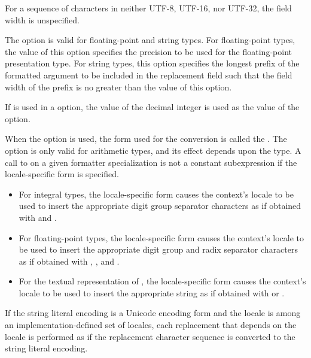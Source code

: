 \pnum
For a sequence of characters in neither UTF-8, UTF-16, nor UTF-32,
the field width is unspecified.

\pnum
The  option is valid
for floating-point and string types.
For floating-point types,
the value of this option specifies the precision
to be used for the floating-point presentation type.
For string types,
this option specifies the longest prefix of the formatted argument
to be included in the replacement field such that
the field width of the prefix is no greater than the value of this option.

\pnum
If  is used in
a  option,
the value of the decimal integer is used as the value of the option.

\pnum
When the  option is used, the form used for the conversion is called
the .
The  option is only valid for arithmetic types, and
its effect depends upon the type.
A call to  on a given formatter specialization
is not a constant subexpression if the locale-specific form is specified.
\begin{itemize}
\item
For integral types, the locale-specific form
causes the context's locale to be used
to insert the appropriate digit group separator characters
as if obtained with
 and
.

\item
For floating-point types, the locale-specific form
causes the context's locale to be used
to insert the appropriate digit group and radix separator characters
as if obtained with
,
, and
.

\item
For the textual representation of , the locale-specific form
causes the context's locale to be used
to insert the appropriate string as if obtained
with  or .
\end{itemize}
If the string literal encoding is a Unicode encoding form and
the locale is among an implementation-defined set of locales,
each replacement that depends on the locale is performed as if
the replacement character sequence is converted to
the string literal encoding.

